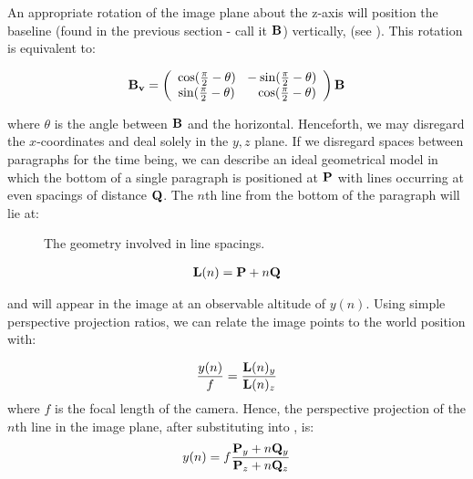 An appropriate rotation of the image plane about the z-axis will position the
baseline (found in the previous section - call it ${ \bf B }$) vertically, 
(see ). This rotation is equivalent to:

\begin{equation}
{ \bf B_{v} } = \left(\begin{array}{cc}\cos(\frac{\pi}{2}-\theta) ~ ~ -\sin(\frac{\pi}{2}-\theta)\\\sin(\frac{\pi}{2}-\theta) ~  ~  ~ ~ ~ \cos(\frac{\pi}{2}-\theta)\end{array}\right) { \bf B } \label{uprightbaseline}
\end{equation}

{\parindent 0mm
where $\theta$ is the angle between ${ \bf B }$ and the horizontal.
Henceforth, we may disregard the $x$-coordinates and deal
solely in the $y,z$ plane. 
If we disregard spaces between paragraphs for the time being,
we can describe an ideal geometrical model in which
the bottom of a single paragraph is positioned
at ${ \bf P }$ with lines occurring at even spacings of distance ${ \bf Q }$.
The $n$th line from the bottom of the paragraph will lie at:
}

\begin{figure}[t]
\centering
\begin{center}
\caption{The geometry involved in line spacings.}
\label{zyspacings}
\end{center}
\end{figure}

\begin{eqnarray}
{ \bf L }(n) = { \bf P }+n{ \bf Q } \label{nthline}
\end{eqnarray}

and will appear in the image at an observable altitude of $y(n)$.
{\parindent 0mm
Using simple perspective projection ratios, we can relate the image points to the world position with:
}

\begin{eqnarray}
\frac{y(n)}{f}  = \frac{ { \bf L }(n)_y }{ { \bf L }(n)_z }  \label{spacingspq1}
\end{eqnarray}
{\parindent 0mm
where $f$ is the focal length of the camera. Hence, the perspective projection
of the  $n$th line in the image plane, after substituting  into
, is: 
}
\begin{eqnarray}
y(n) =  f \frac{ { \bf P }_y + n { \bf Q }_y }{ { \bf P }_z + n{ \bf Q }_z } \label{spacingspq}
\end{eqnarray}


